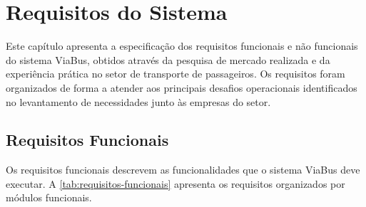 \chapter{Requisitos do Sistema}\label{cha:requisitos}

Este capítulo apresenta a especificação dos requisitos funcionais e não funcionais do sistema ViaBus, obtidos através da pesquisa de mercado realizada e da experiência prática no setor de transporte de passageiros. Os requisitos foram organizados de forma a atender aos principais desafios operacionais identificados no levantamento de necessidades junto às empresas do setor.
\section{Requisitos Funcionais}

Os requisitos funcionais descrevem as funcionalidades que o sistema ViaBus deve executar. A \autoref{tab:requisitos-funcionais} apresenta os requisitos organizados por módulos funcionais.

